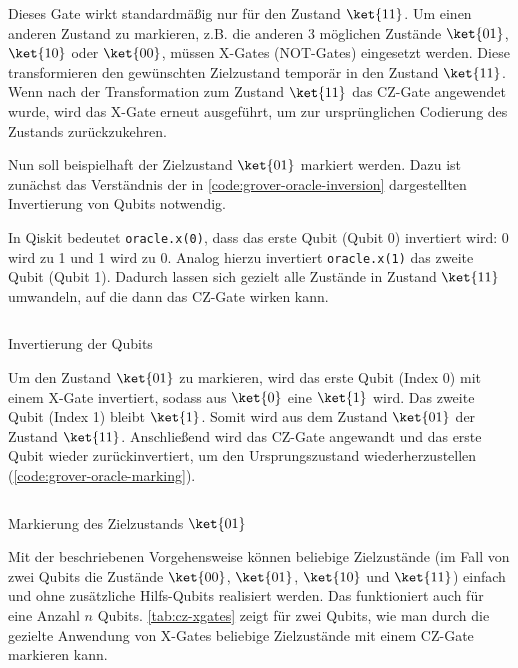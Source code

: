 Dieses Gate wirkt standardmäßig nur für den Zustand $\ket{11}$. Um einen anderen Zustand zu markieren, z.B. die anderen 3 möglichen Zustände $\ket{01}$, $\ket{10}$ oder $\ket{00}$, müssen X-Gates (NOT-Gates) eingesetzt werden. Diese transformieren den gewünschten Zielzustand temporär in den Zustand $\ket{11}$. Wenn nach der Transformation zum Zustand $\ket{11}$ das CZ-Gate angewendet wurde, wird das X-Gate erneut ausgeführt, um zur ursprünglichen Codierung des Zustands zurückzukehren.

Nun soll beispielhaft der Zielzustand $\ket{01}$ markiert werden. Dazu ist zunächst das Verständnis der in \autoref{code:grover-oracle-inversion} dargestellten Invertierung von Qubits notwendig.

In Qiskit bedeutet \texttt{oracle.x(0)}, dass das erste Qubit (Qubit 0) invertiert wird: 0 wird zu 1 und 1 wird zu 0. Analog hierzu invertiert \texttt{oracle.x(1)} das zweite Qubit (Qubit 1). Dadurch lassen sich gezielt alle Zustände in Zustand $\ket{11}$ umwandeln, auf die dann das CZ-Gate wirken kann.

\begin{listing}[ht!]
  \inputminted{python}{code/quantum-software/grover-oracle-inversion.py}
  \caption{Invertierung der Qubits}
  \label{code:grover-oracle-inversion}
\end{listing}

Um den Zustand $\ket{01}$ zu markieren, wird das erste Qubit (Index 0) mit einem X-Gate invertiert, sodass aus $\ket{0}$ eine $\ket{1}$ wird. Das zweite Qubit (Index 1) bleibt $\ket{1}$. Somit wird aus dem Zustand $\ket{01}$ der Zustand $\ket{11}$. Anschließend wird das CZ-Gate angewandt und das erste Qubit wieder zurückinvertiert, um den Ursprungszustand wiederherzustellen (\autoref{code:grover-oracle-marking}).

\begin{listing}[ht!]
  \inputminted{python}{code/quantum-software/grover-oracle-marking.py}
  \caption{Markierung des Zielzustands $\ket{01}$}
  \label{code:grover-oracle-marking}
\end{listing}

Mit der beschriebenen Vorgehensweise können beliebige Zielzustände (im Fall von zwei Qubits die Zustände $\ket{00}$, $\ket{01}$, $\ket{10}$ und $\ket{11}$) einfach und ohne zusätzliche Hilfs-Qubits realisiert werden. Das funktioniert auch für eine Anzahl $n$ Qubits. \autoref{tab:cz-xgates} zeigt für zwei Qubits, wie man durch die gezielte Anwendung von X-Gates beliebige Zielzustände mit einem CZ-Gate markieren kann. \autocite{roy_deterministic_2022}

